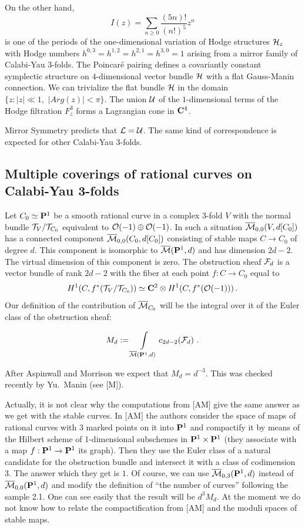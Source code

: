 \documentclass{amsart}
\begin{document}
On the other hand,
 $$I(z)=\sum_{n\ge 0} \frac{(5n)!}{(n!)^5}z^n$$
 is one of the periods of the one-dimensional variation of Hodge structures
$\Cal H_z $ with Hodge numbers $h^{0,3}=h^{1,2}=h^{2,1}=h^{3,0}=1$
 arising from a mirror family of Calabi-Yau $3$-folds.
  The Poincar\'e pairing defines a covariantly constant symplectic structure on
$4$-dimensional vector bundle $\Cal H$ with a flat  Gauss-Manin connection.  We
can trivialize the flat bundle $\Cal H$
 in the domain $\{z: |z|\ll 1,\,\,|Arg(z)|< \pi\}$. The union $\Cal U$ of the
$1$-dimensional terms of the Hodge filtration $F^3_z$ forms a Lagrangian cone
in $\C^4$.

Mirror Symmetry predicts that $\Cal L=\Cal U$.
 The same kind of correspondence is expected for other Calabi-Yau
 $3$-folds.







\subsection{Multiple coverings of rational curves on Calabi-Yau 3-folds}

Let $C_0\simeq\P^1$ be a  smooth rational curve in a complex 3-fold $V$ with
the normal bundle $\Cal T_V/\Cal T_{C_0}$ equivalent to $\O(-1)\oplus\O(-1)$.
In such a situation  $\M_{0,0}(V,d[C_0])$ has a connected component
$\M_{0,0}(C_0,d[C_0])$ consisting of  stable maps
 $C\to C_0$ of degree $d$. This component is isomorphic to $\M(\P^1,d)$ and has
dimension $2d-2$. The virtual dimension
 of this component is zero. The obstruction sheaf $\F_d$ is a vector bundle of
rank $2d-2$ with the fiber at each point $f:C\to C_0$
 equal to
$$H^1(C,f^*(\Cal T_V/\Cal T_{C_0}))\simeq\C^2\otimes H^1(C,f^*(\O(-1)))\,.$$
Our definition
 of the contribution of $\M_{C_0}$ will be the integral over it
of the Euler class of the obstruction sheaf:

$$M_d:=\int\limits_{\M(\P^1,d)} c_{2d-2}(\F_d)\,\,.$$

After Aspinwall and Morrison we expect that
$M_d=d^{-3}$. This was checked recently by Yu.~Manin (see [M]).


Actually, it is not clear why the computations from [AM]
 give the same answer as we get with the stable curves.
 In [AM] the authors consider the space of maps of rational curves with 3
marked
 points on it into $\P^1$ and compactify it by means of the Hilbert scheme of
1-dimensional subschemes in $\P^1\times \P^1$
 (they associate with a map $f:\P^1\to \P^1$ its graph).
Then they use the Euler class of a natural candidate for the obstruction bundle
and intersect it with a class of codimension $3$.
The answer which they get is $1$.
Of course, we can use $\M_{0,3}(\P^1,d)$ instead of $\M_{0,0}(\P^1,d)$ and
 modify the definition of ``the number of curves'' following the sample 2.1.
One can see easily that the result will be $d^3 M_d$.
  At the moment we do not know how to relate the  compactification from [AM]
and the moduli spaces of stable maps.
\end{document}
